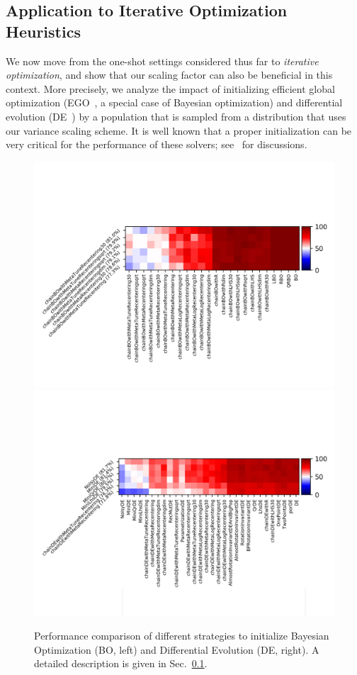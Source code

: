 \subsection{Application to Iterative Optimization Heuristics}\label{sec:initialization}
We now move from the one-shot settings considered thus far to \textit{iterative optimization}, and show that our scaling factor can also be beneficial in this context. More precisely, we analyze the impact of initializing efficient global optimization (EGO~\cite{ego}, a special case of Bayesian optimization) and differential evolution (DE~\cite{de}) by a population that is sampled from a distribution that uses our variance scaling scheme. 
It is well known that a proper initialization can be very critical for the performance of these solvers;  see~\cite{feurer2015initializing,inoculation2,centerbased,qrinit,BossekDK20} for discussions. %
\begin{figure}[t]
    \centering
    \includegraphics[trim={10 30 12 80}, clip,width=.49\textwidth]{sections/appendix/ppsn2020-rescaling/figures/parahdbo4d.png}
    \includegraphics[trim={10 30 12 80}, clip,width=.49\textwidth]{sections/appendix/ppsn2020-rescaling/figures/paraalldes.png}
    \vspace{-10pt}
    \caption{Performance comparison of different strategies to initialize Bayesian Optimization (BO, left) and Differential Evolution (DE, right). A detailed description is given in Sec.~\ref{sec:initialization}. }
    \label{deinitxp}\label{boinit}
\end{figure}
